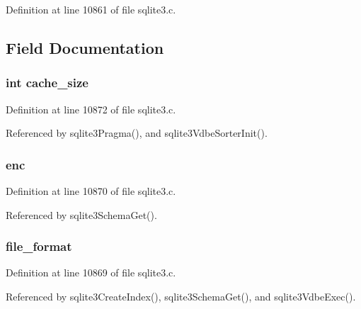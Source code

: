 Definition at line 10861 of file sqlite3.\+c.



\subsection{Field Documentation}
\hypertarget{struct_schema_adc2cfac3a357c5424aafa9d351a2e6ea}{}
\subsubsection[{cache\+\_\+size}]{\setlength{\rightskip}{0pt plus 5cm}int cache\+\_\+size}\label{struct_schema_adc2cfac3a357c5424aafa9d351a2e6ea}


Definition at line 10872 of file sqlite3.\+c.



Referenced by sqlite3\+Pragma(), and sqlite3\+Vdbe\+Sorter\+Init().

\hypertarget{struct_schema_a9c71ab1f0d39a2b088a6d8a1093159c0}{}
\subsubsection[{enc}]{ enc}\label{struct_schema_a9c71ab1f0d39a2b088a6d8a1093159c0}


Definition at line 10870 of file sqlite3.\+c.



Referenced by sqlite3\+Schema\+Get().

\hypertarget{struct_schema_a7d836a44b011f0174f4ae911402287a1}{}
\subsubsection[{file\+\_\+format}]{ file\+\_\+format}\label{struct_schema_a7d836a44b011f0174f4ae911402287a1}


Definition at line 10869 of file sqlite3.\+c.



Referenced by sqlite3\+Create\+Index(), sqlite3\+Schema\+Get(), and sqlite3\+Vdbe\+Exec().

\hypertarget{struct_schema_af04ec7c35bed826152f53e5690b2cbf1}{}
